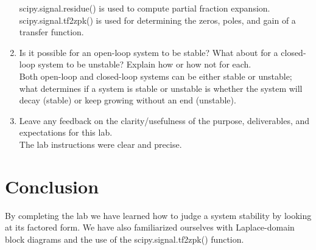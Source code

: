 \documentclass[12pt,a4paper]{article}
\begin{document}
\begin{enumerate}
    scipy.signal.residue() is used to compute partial fraction expansion.\\
    
    scipy.signal.tf2zpk() is used for determining the zeros, poles, and gain of a transfer function.\\
    
    \item
    Is it possible for an open-loop system to be stable? What about for a closed-loop system to be unstable? Explain how or how not for each.\\
    
    Both open-loop and closed-loop systems can be either stable or unstable; what determines if a system is stable or unstable is whether the system will decay (stable) or keep growing without an end (unstable).\\
    
    \item
    Leave any feedback on the clarity/usefulness of the purpose, deliverables, and expectations for this lab.\\
    The lab instructions were clear and precise. 

\end{enumerate}
\section{Conclusion}\label{sec:res}
    
    By completing the lab we have learned how to judge a system stability by looking at its factored form. We have also familiarized ourselves with Laplace-domain block diagrams and the use of the scipy.signal.tf2zpk() function.
 


\end{document}
